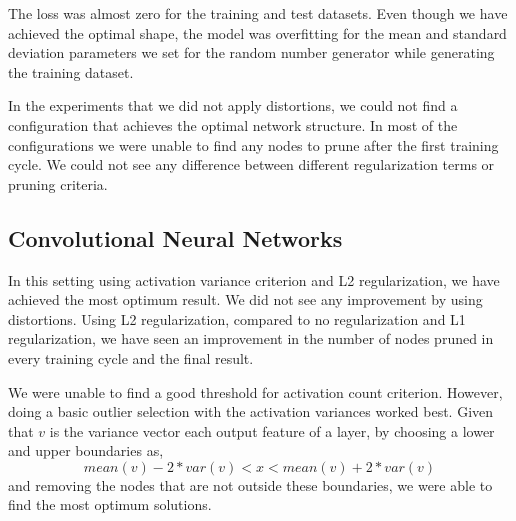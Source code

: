 The loss was almost zero for the training and test datasets. Even though we have achieved the optimal shape, the model was overfitting for the mean and standard deviation parameters we set for the random number generator while generating the training dataset.

In the experiments that we did not apply distortions, we could not find a configuration that achieves the optimal network structure. In most of the configurations we were unable to find any nodes to prune after the first training cycle. We could not see any difference between different regularization terms or pruning criteria.

\subsection{Convolutional Neural Networks}
In this setting using activation variance criterion and L2 regularization, we have achieved the most optimum result. We did not see any improvement by using distortions. Using L2 regularization, compared to no regularization and L1 regularization, we have seen an improvement in the number of nodes pruned in every training cycle and the final result.

We were unable to find a good threshold for activation count criterion. However, doing a basic outlier selection with the activation variances worked best. Given that $v$ is the variance vector each output feature of a layer, by choosing a lower and upper boundaries as,
$$ mean(v) - 2*var(v) < x < mean(v) + 2*var(v) $$
and removing the nodes that are not outside these boundaries, we were able to find the most optimum solutions. 

